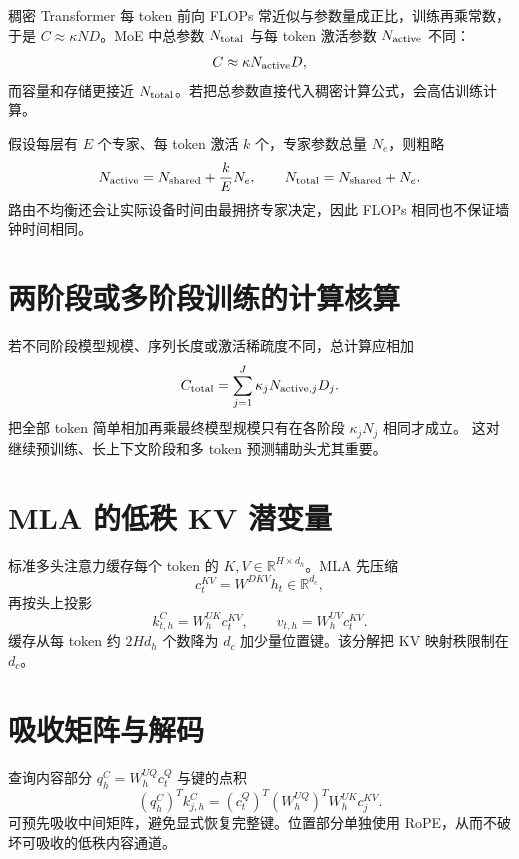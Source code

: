 \documentclass[11pt]{article}
\numberwithin{equation}{section}
\newcommand{\R}{\mathbb{R}}
\newcommand{\1}{\mathbf{1}}
\begin{document}
稠密 Transformer 每 token 前向 FLOPs 常近似与参数量成正比，训练再乘常数，
于是 $C\approx\kappa ND$。MoE 中总参数 $N_{\rm total}$ 与每 token 激活参数
$N_{\rm active}$ 不同：
\begin{equation}
 C\approx\kappa N_{\rm active}D,
\end{equation}
而容量和存储更接近 $N_{\rm total}$。若把总参数直接代入稠密计算公式，会高估训练计算。

假设每层有 $E$ 个专家、每 token 激活 $k$ 个，专家参数总量 $N_e$，则粗略
\begin{equation}
 N_{\rm active}=N_{\rm shared}+\frac{k}{E}N_e,\qquad
 N_{\rm total}=N_{\rm shared}+N_e.
\end{equation}
路由不均衡还会让实际设备时间由最拥挤专家决定，因此 FLOPs 相同也不保证墙钟时间相同。

\section{两阶段或多阶段训练的计算核算}

若不同阶段模型规模、序列长度或激活稀疏度不同，总计算应相加
\begin{equation}
 C_{\rm total}=\sum_{j=1}^{J}\kappa_jN_{{\rm active},j}D_j.
\end{equation}
把全部 token 简单相加再乘最终模型规模只有在各阶段 $\kappa_jN_j$ 相同才成立。
这对继续预训练、长上下文阶段和多 token 预测辅助头尤其重要。

\section{MLA 的低秩 KV 潜变量}
标准多头注意力缓存每个 token 的 $K,V\in\R^{H\times d_h}$。MLA 先压缩
\begin{equation}
  c_t^{KV}=W^{DKV}h_t\in\R^{d_c},
\end{equation}
再按头上投影
\begin{equation}
  k_{t,h}^C=W_h^{UK}c_t^{KV},\qquad
  v_{t,h}=W_h^{UV}c_t^{KV}.
\end{equation}
缓存从每 token 约 $2Hd_h$ 个数降为 $d_c$ 加少量位置键。该分解把 KV 映射秩限制在 $d_c$。

\section{吸收矩阵与解码}
查询内容部分 $q_h^C=W_h^{UQ}c_t^Q$ 与键的点积
\begin{equation}
  (q_h^C)^Tk_{j,h}^C
  =(c_t^Q)^T(W_h^{UQ})^TW_h^{UK}c_j^{KV}.
\end{equation}
可预先吸收中间矩阵，避免显式恢复完整键。位置部分单独使用 RoPE，从而不破坏可吸收的低秩内容通道。
\end{document}

